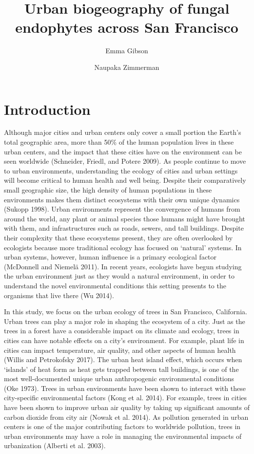 \documentclass[fleqn,10pt,lineno]{wlpeerj} %
\title{Urban biogeography of fungal endophytes across San Francisco}
\author[1]{Emma Gibson}
\author[2]{Naupaka Zimmerman}
\affil[1]{(unsure)}
\affil[2]{University of San Francisco 2130 Fulton StreetSan Francisco,
CA 94117-1080 USA}
\begin{document}
\flushbottom
\maketitle
\thispagestyle{empty}

\hypertarget{introduction}{%
\section*{Introduction}\label{introduction}}

Although major cities and urban centers only cover a small portion the
Earth's total geographic area, more than 50\% of the human population
lives in these urban centers, and the impact that these cities have on
the environment can be seen worldwide (Schneider, Friedl, and Potere
2009). As people continue to move to urban environments, understanding
the ecology of cities and urban settings will become critical to human
health and well being. Despite their comparatively small geographic
size, the high density of human populations in these environments makes
them distinct ecosystems with their own unique dynamics (Sukopp 1998).
Urban environments represent the convergence of humans from around the
world, any plant or animal species those humans might have brought with
them, and infrastructures such as roads, sewers, and tall buildings.
Despite their complexity that these ecosystems present, they are often
overlooked by ecologists because more traditional ecology has focused on
`natural' systems. In urban systems, however, human influence is a
primary ecological factor (McDonnell and Niemelä 2011). In recent years,
ecologists have begun studying the urban environment just as they would
a natural environment, in order to understand the novel environmental
conditions this setting presents to the organisms that live there (Wu
2014).

In this study, we focus on the urban ecology of trees in San Francisco,
California. Urban trees can play a major role in shaping the ecosystem
of a city. Just as the trees in a forest have a considerable impact on
its climate and ecology, trees in cities can have notable effects on a
city's environment. For example, plant life in cities can impact
temperature, air quality, and other aspects of human health (Willis and
Petrokofsky 2017). The urban heat island effect, which occurs when
`islands' of heat form as heat gets trapped between tall buildings, is
one of the most well-documented unique urban anthropogenic environmental
conditions (Oke 1973). Trees in urban environments have been shown to
interact with these city-specific environmental factors (Kong et al.
2014). For example, trees in cities have been shown to improve urban air
quality by taking up significant amounts of carbon dioxide from city air
(Nowak et al. 2014). As pollution generated in urban centers is one of
the major contributing factors to worldwide pollution, trees in urban
environments may have a role in managing the environmental impacts of
urbanization (Alberti et al. 2003).
\end{document}
